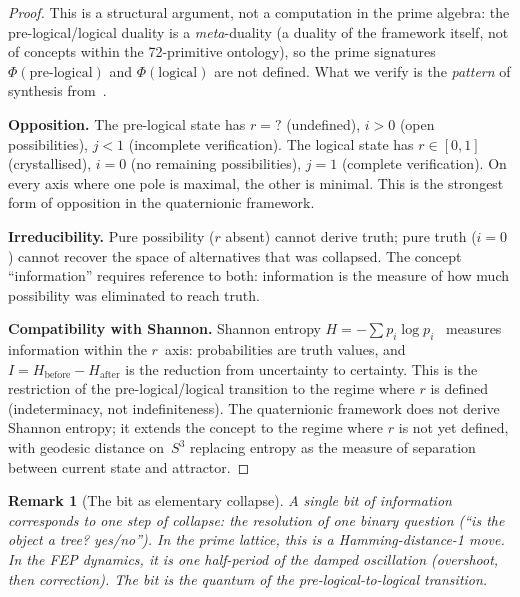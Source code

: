 \documentclass[11pt,a4paper]{article}
\newtheorem{remark}[theorem]{Remark}
\begin{document}
\begin{proof}
This is a structural argument, not a computation in the prime algebra:
the pre-logical/\allowbreak logical duality is a \emph{meta}-duality (a duality of
the framework itself, not of concepts within the 72-primitive ontology),
so the prime signatures $\Phi(\text{pre-logical})$ and
$\Phi(\text{logical})$ are not defined. What we verify is the
\emph{pattern} of synthesis from~\citet{p12}.

\textbf{Opposition.}
The pre-logical state has $r = {?}$ (undefined), $i > 0$ (open
possibilities), $j < 1$ (incomplete verification). The logical state has
$r \in [0,1]$ (crystallised), $i = 0$ (no remaining possibilities),
$j = 1$ (complete verification). On every axis where one pole is maximal,
the other is minimal. This is the strongest form of opposition in the
quaternionic framework.

\textbf{Irreducibility.}
Pure possibility ($r$ absent) cannot derive truth; pure truth ($i = 0$)
cannot recover the space of alternatives that was collapsed.
The concept ``information'' requires reference to both: information
is the measure of how much possibility was eliminated to reach truth.

\textbf{Compatibility with Shannon.}
Shannon entropy $H = -\sum p_i \log p_i$~\citep{shannon1948} measures
information within the $r$~axis: probabilities are truth values, and
$I = H_{\text{before}} - H_{\text{after}}$ is the reduction from
uncertainty to certainty. This is the restriction of the pre-logical/\allowbreak logical
transition to the regime where $r$ is defined (indeterminacy, not
indefiniteness). The quaternionic framework does not derive Shannon
entropy; it extends the concept to the regime where $r$ is not yet
defined, with geodesic distance on~$S^3$ replacing entropy as the
measure of separation between current state and attractor.
\end{proof}

\begin{remark}[The bit as elementary collapse]
A single bit of information corresponds to one step of collapse: the
resolution of one binary question (``is the object a tree? yes/no'').
In the prime lattice, this is a Hamming-distance-1 move. In the FEP
dynamics, it is one half-period of the damped oscillation (overshoot,
then correction). The bit is the quantum of the pre-logical-to-logical
transition.
\end{remark}

\end{document}
